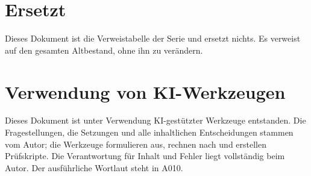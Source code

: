 \section{Ersetzt}

Dieses Dokument ist die Verweistabelle der Serie und ersetzt nichts. Es verweist
auf den gesamten Altbestand, ohne ihn zu verändern.

\section{Verwendung von KI-Werkzeugen}

Dieses Dokument ist unter Verwendung KI-gestützter Werkzeuge entstanden. Die
Fragestellungen, die Setzungen und alle inhaltlichen Entscheidungen stammen vom
Autor; die Werkzeuge formulieren aus, rechnen nach und erstellen Prüfskripte.
Die Verantwortung für Inhalt und Fehler liegt vollständig beim Autor. Der
ausführliche Wortlaut steht in A010.
